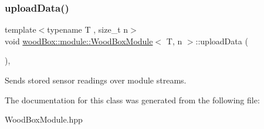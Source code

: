 \subsubsection{\texorpdfstring{upload\+Data()}{uploadData()}}
{\footnotesize\ttfamily template$<$typename T , size\+\_\+t n$>$ \\
void \mbox{\hyperlink{classwood_box_1_1module_1_1_wood_box_module}{wood\+Box\+::module\+::\+Wood\+Box\+Module}}$<$ T, n $>$\+::upload\+Data (\begin{DoxyParamCaption}{ }\end{DoxyParamCaption})\hspace{0.3cm}{\ttfamily [inline]}, {\ttfamily [protected]}}

Sends stored sensor readings over module streams. 

The documentation for this class was generated from the following file\+:\begin{DoxyCompactItemize}
\item 
Wood\+Box\+Module.\+hpp\end{DoxyCompactItemize}
